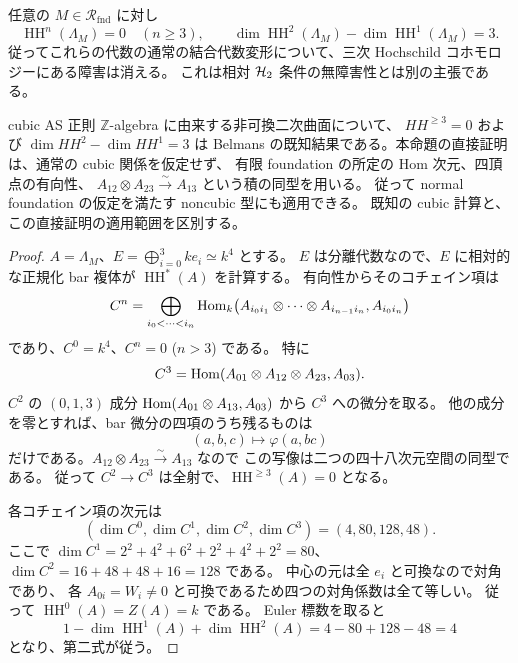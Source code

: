 \begin{proposition}
\label{prop:foundation-hochschild}
任意の $M\in\mathcal R_{\mathrm{fnd}}$ に対し
\[
 \operatorname{HH}^n(\Lambda_M)=0\quad(n\ge3),\qquad
 \dim\operatorname{HH}^2(\Lambda_M)
 -\dim\operatorname{HH}^1(\Lambda_M)=3.
\]
従ってこれらの代数の通常の結合代数変形について、三次 Hochschild コホモロジーにある障害は消える。
これは相対 $\mathcal H_2$ 条件の無障害性とは別の主張である。
\end{proposition}

\begin{remark}
cubic AS 正則 $\mathbb Z$-algebra に由来する非可換二次曲面について、
$HH^{\geq3}=0$ および
$\dim HH^2-\dim HH^1=3$ は
Belmans \cite[Proposition 31, Corollary 32]{Belmans2019}
の既知結果である。本命題の直接証明は、通常の cubic 関係を仮定せず、
有限 foundation の所定の Hom 次元、四頂点の有向性、
$A_{12}\otimes A_{23}\xrightarrow{\sim}A_{13}$ という積の同型を用いる。
従って normal foundation の仮定を満たす noncubic 型にも適用できる。
既知の cubic 計算と、この直接証明の適用範囲を区別する。
\end{remark}

\begin{proof}
$A=\Lambda_M$、$E=\bigoplus_{i=0}^3ke_i\simeq k^4$ とする。
$E$ は分離代数なので、$E$ に相対的な正規化 bar 複体が $\operatorname{HH}^*(A)$ を計算する。
有向性からそのコチェイン項は
\[
 C^n=\bigoplus_{i_0<\cdots<i_n}
 \operatorname{Hom}_k\bigl(A_{i_0i_1}\otimes\cdots\otimes A_{i_{n-1}i_n},
             A_{i_0i_n}\bigr)
\]
であり、$C^0=k^4$、$C^n=0$ ($n>3$) である。
特に
\[
 C^3=\operatorname{Hom}(A_{01}\otimes A_{12}\otimes A_{23},A_{03}).
\]
$C^2$ の $(0,1,3)$ 成分
$\operatorname{Hom}(A_{01}\otimes A_{13},A_{03})$ から $C^3$ への微分を取る。
他の成分を零とすれば、bar 微分の四項のうち残るものは
\[
 (a,b,c)\longmapsto\varphi(a,bc)
\]
だけである。$A_{12}\otimes A_{23}\xrightarrow\sim A_{13}$ なので
この写像は二つの四十八次元空間の同型である。
従って $C^2\to C^3$ は全射で、$\operatorname{HH}^{\ge3}(A)=0$ となる。

各コチェイン項の次元は
\[
 (\dim C^0,\dim C^1,\dim C^2,\dim C^3)
 =(4,80,128,48).
\]
ここで $\dim C^1=2^2+4^2+6^2+2^2+4^2+2^2=80$、
$\dim C^2=16+48+48+16=128$ である。
中心の元は全 $e_i$ と可換なので対角であり、
各 $A_{0i}=W_i\ne0$ と可換であるため四つの対角係数は全て等しい。
従って $\operatorname{HH}^0(A)=Z(A)=k$ である。
Euler 標数を取ると
\[
 1-\dim\operatorname{HH}^1(A)+\dim\operatorname{HH}^2(A)
 =4-80+128-48=4
\]
となり、第二式が従う。
\end{proof}



